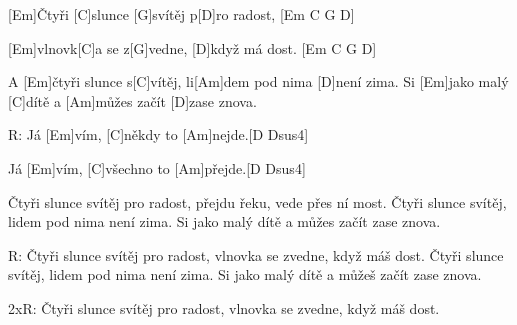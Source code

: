 
[Em]\null Čtyři [C]slunce [G]svítěj p[D]ro radost, [Em C G D]

[Em]vlnovk[C]a se z[G]vedne, [D]když má dost. [Em C G D]

A [Em]\null čtyři slunce s[C]vítěj, 
li[Am]dem pod nima [D]není zima. 
Si [Em]jako malý [C]dítě 
a [Am]můžes začít [D]zase znova. 

R: Já [Em]vím, [C]někdy to [Am]nejde.[D Dsus4] 

Já [Em]vím, [C]všechno to [Am]přejde.[D Dsus4]

Čtyři slunce svítěj pro radost, 
přejdu řeku, vede přes ní most.
Čtyři slunce svítěj, 
lidem pod nima není zima. 
Si jako malý dítě 
a můžes začít zase znova. 

R: 
Čtyři slunce svítěj pro radost, 
vlnovka se zvedne, když máš dost. 
Čtyři slunce svítěj, 
lidem pod nima není zima. 
Si jako malý dítě 
a můžeš začít zase znova. 

2xR: 
Čtyři slunce svítěj pro radost, 
vlnovka se zvedne, když máš dost.